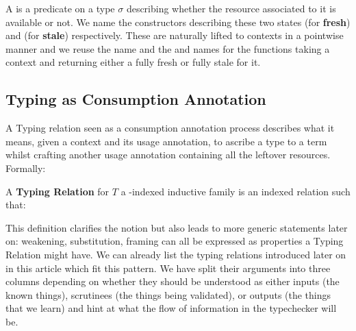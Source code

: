 \begin{definition}
\label{definition:usage}
A \textbf{\Usage{}} is a predicate on a type $σ$ describing whether the
resource associated to it is available or not. We name the
constructors describing these two states \fresh{} (for \textbf{fresh})
and \stale{} (for \textbf{stale}) respectively.
These are naturally lifted to contexts in a pointwise manner and we reuse
the \Usages{} name and the \fresh{} and \stale{} names for the functions
taking a context and returning either a fully fresh or fully stale \Usages{}
for it.

\end{definition}

\subsection{Typing as Consumption Annotation}

A Typing relation seen as a consumption annotation process describes
what it means, given a context and its usage annotation, to ascribe a
type to a term whilst crafting another usage annotation containing all
the leftover resources. Formally:

\begin{definition}
\label{definition:typing}
A \textbf{Typing Relation} for $T$ a \Nat{}-indexed inductive family is
an indexed relation  such that:
\end{definition}

This definition clarifies the notion but also leads to more generic
statements later on: weakening, substitution, framing can all be
expressed as properties a Typing Relation might have. We can already
list the typing relations introduced later on in this article which
fit this pattern. We have split their arguments into three columns
depending on whether they should be understood as either inputs (the
known things), scrutinees (the things being validated), or outputs
(the things that we learn) and hint at what the flow of information
in the typechecker will be.

